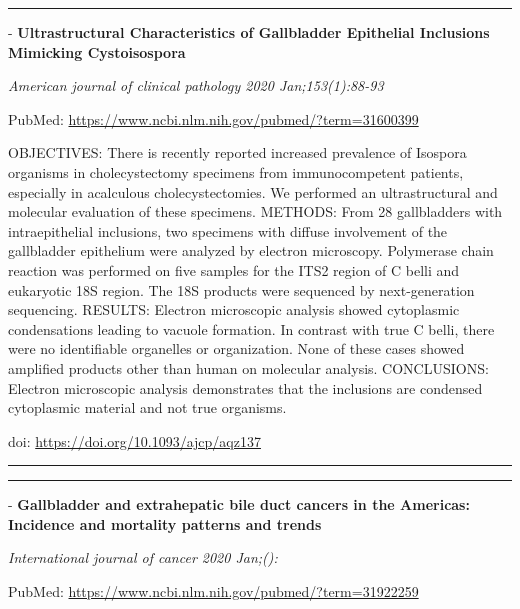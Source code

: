 \documentclass[
]{article}
\begin{document}
\begin{center}\rule{0.5\linewidth}{0.5pt}\end{center}

- \textbf{Ultrastructural Characteristics of Gallbladder Epithelial
Inclusions Mimicking Cystoisospora}

\emph{American journal of clinical pathology 2020 Jan;153(1):88-93}

PubMed: \url{https://www.ncbi.nlm.nih.gov/pubmed/?term=31600399}

OBJECTIVES: There is recently reported increased prevalence of Isospora
organisms in cholecystectomy specimens from immunocompetent patients,
especially in acalculous cholecystectomies. We performed an
ultrastructural and molecular evaluation of these specimens. METHODS:
From 28 gallbladders with intraepithelial inclusions, two specimens with
diffuse involvement of the gallbladder epithelium were analyzed by
electron microscopy. Polymerase chain reaction was performed on five
samples for the ITS2 region of C belli and eukaryotic 18S region. The
18S products were sequenced by next-generation sequencing. RESULTS:
Electron microscopic analysis showed cytoplasmic condensations leading
to vacuole formation. In contrast with true C belli, there were no
identifiable organelles or organization. None of these cases showed
amplified products other than human on molecular analysis. CONCLUSIONS:
Electron microscopic analysis demonstrates that the inclusions are
condensed cytoplasmic material and not true organisms.

doi: \url{https://doi.org/10.1093/ajcp/aqz137}

\begin{center}\rule{0.5\linewidth}{0.5pt}\end{center}

\begin{center}\rule{0.5\linewidth}{0.5pt}\end{center}

- \textbf{Gallbladder and extrahepatic bile duct cancers in the
Americas: Incidence and mortality patterns and trends}

\emph{International journal of cancer 2020 Jan;():}

PubMed: \url{https://www.ncbi.nlm.nih.gov/pubmed/?term=31922259}
\end{document}

